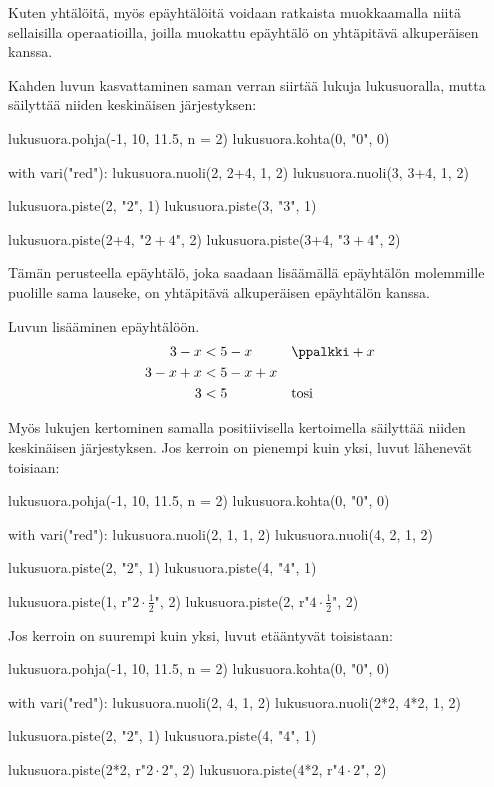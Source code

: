 Kuten yhtälöitä, myös epäyhtälöitä voidaan ratkaista muokkaamalla niitä sellaisilla operaatioilla, joilla muokattu epäyhtälö on yhtäpitävä alkuperäisen kanssa.

Kahden luvun kasvattaminen saman verran siirtää lukuja lukusuoralla, mutta säilyttää niiden keskinäisen järjestyksen:

\begin{kuva}
lukusuora.pohja(-1, 10, 11.5, n = 2)
lukusuora.kohta(0, "$0$", 0)

with vari("red"):
	lukusuora.nuoli(2, 2+4, 1, 2)
	lukusuora.nuoli(3, 3+4, 1, 2)

lukusuora.piste(2, "$2$", 1)
lukusuora.piste(3, "$3$", 1)

lukusuora.piste(2+4, "$2\!+\!4$", 2)
lukusuora.piste(3+4, "$3\!+\!4$", 2)
\end{kuva}

Tämän perusteella epäyhtälö, joka saadaan lisäämällä epäyhtälön molemmille puolille sama lauseke, on yhtäpitävä alkuperäisen epäyhtälön kanssa.

\begin{esimerkki}
Luvun lisääminen epäyhtälöön.
  \begin{align*}
     3 - x &< 5 - x && \ppalkki +x\\
     3 -x +x &< 5 -x +x \\
     3 &< 5 && \textrm{tosi}
  \end{align*}
\end{esimerkki}

Myös lukujen kertominen samalla positiivisella kertoimella säilyttää niiden keskinäisen järjestyksen. Jos kerroin on pienempi kuin yksi, luvut lähenevät toisiaan:

\begin{kuva}
lukusuora.pohja(-1, 10, 11.5, n = 2)
lukusuora.kohta(0, "$0$", 0)

with vari("red"):
	lukusuora.nuoli(2, 1, 1, 2)
	lukusuora.nuoli(4, 2, 1, 2)

lukusuora.piste(2, "$2$", 1)
lukusuora.piste(4, "$4$", 1)

lukusuora.piste(1, r"$2 \cdot \frac{1}{2}$", 2)
lukusuora.piste(2, r"$4 \cdot \frac{1}{2}$", 2)
\end{kuva}

Jos kerroin on suurempi kuin yksi, luvut etääntyvät toisistaan:

\begin{kuva}
lukusuora.pohja(-1, 10, 11.5, n = 2)
lukusuora.kohta(0, "$0$", 0)

with vari("red"):
	lukusuora.nuoli(2, 4, 1, 2)
	lukusuora.nuoli(2*2, 4*2, 1, 2)

lukusuora.piste(2, "$2$", 1)
lukusuora.piste(4, "$4$", 1)

lukusuora.piste(2*2, r"$2 \cdot 2$", 2)
lukusuora.piste(4*2, r"$4 \cdot 2$", 2)
\end{kuva}

